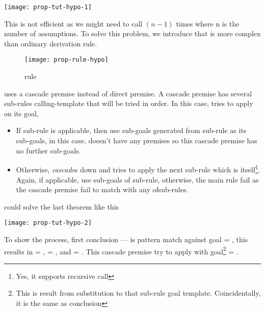 \documentclass[master.tex]{subfiles}
\begin{document}
\begin{center}
\texttt{[image: prop-tut-hypo-1]}
\end{center}

This is not efficient as we might need to call  $(n - 1)$
times where n is the number of assumptions. To solve this problem, we introduce
  that is more complex than ordinary derivation rule.


\begin{figure}[H]
\begin{minipage}{\textwidth}
    \centering
\texttt{[image: prop-rule-hypo]}
\end{minipage}
    \caption{rule }
\label{fig:prop-rule-hypothesis}
\end{figure}

 uses a cascade premise instead of direct premise. A cascade
premise has several sub-rules calling-template that will be tried in order. In
this case,  tries to apply  on its
goal,
\begin{itemize}
\item If sub-rule is applicable, then use sub-goals generated from sub-rule as
  its sub-goals, in this case,  doesn't have any premises
  so this cascade premise has no further sub-goals.
\item Otherwise, \emph{cascade}s down and tries to apply the next sub-rule which
  is  itself\footnote{Yes, it supports recursive call}. Again,
  if applicable, use sub-goals of sub-rule, otherwise, the main
   rule fail as the cascade premise fail to match with any
  ofsub-rules.
\end{itemize}

 could solve the last theorem like this

\begin{center}
\texttt{[image: prop-tut-hypo-2]}
\end{center}

To show the process, first  conclusion ---
 is pattern match against goal = ,
this results in  = ,  =
, and \pvar{$\Gamma$} = . This
cascade premise try to apply  with goal\footnote{This is
  result from substitution to that sub-rule goal template. Coincidentally, it is
  the same as  conclusion} = .
\end{document}
